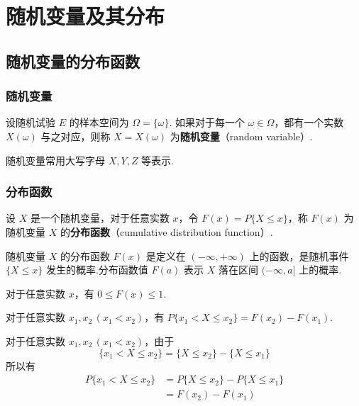
\chapter{随机变量及其分布}

\section{随机变量的分布函数}

\subsection{随机变量}

\begin{definition}
    设随机试验 $E$ 的样本空间为 $\varOmega=\{\omega\}$. 如果对于每一个 $\omega\in\varOmega$，都有一个实数 $X(\omega)$ 与之对应，则称 $X=X(\omega)$ 为\textbf{随机变量}（random variable）.
\end{definition}

随机变量常用大写字母 $X,Y,Z$ 等表示.

\subsection{分布函数}

\begin{definition}
    设 $X$ 是一个随机变量，对于任意实数 $x$，令 $F(x)=P\{X \leqslant x\}$，称 $F(x)$ 为随机变量 $X$ 的\textbf{分布函数}（cumulative distribution function）.
\end{definition}

随机变量 $X$ 的分布函数 $F(x)$ 是定义在 $(-\infty,+\infty)$ 上的函数，是随机事件 $\{X \leqslant x\}$ 发生的概率.分布函数值 $F(a)$ 表示 $X$ 落在区间 $(-\infty,a]$ 上的概率.

\setcounter{propertyname}{0}

\begin{property}
    对于任意实数 $x$，有 $0 \leqslant F(x) \leqslant 1$.
\end{property}

\begin{property}
    对于任意实数 $x_1,x_2\, (x_1<x_2)$，有 $P\{x_1 < X \leqslant x_2\}=F(x_2)-F(x_1)$.
\end{property}

\begin{myproof}
    对于任意实数 $x_1,x_2\, (x_1<x_2)$，由于
    $$
    \{x_1 < X \leqslant x_2\} = \{X \leqslant x_2\} - \{X \leqslant x_1\}
    $$
    所以有
    $$
    \begin{aligned}
        P\{x_1 < X \leqslant x_2\} &= P\{X \leqslant x_2\} - P\{X \leqslant x_1\}\\
        &= F(x_2)-F(x_1)
    \end{aligned}
    $$
\end{myproof}


